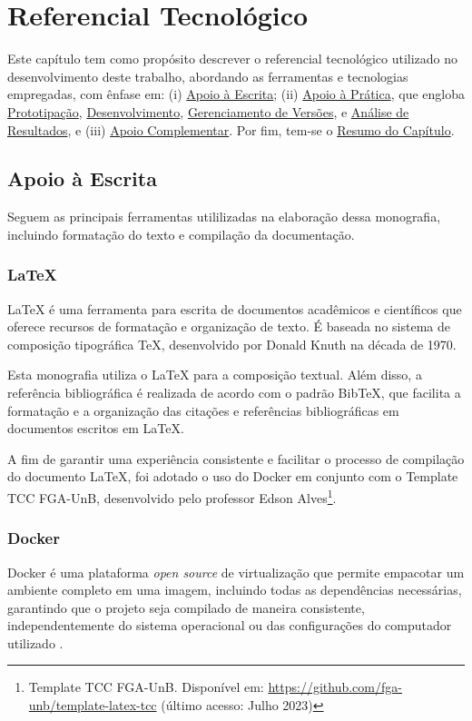\chapter[Referencial Tecnológico]{Referencial Tecnológico}
\label{chap:ReferencialTech}

Este capítulo tem como propósito descrever o referencial tecnológico utilizado no desenvolvimento
deste trabalho, abordando as ferramentas e tecnologias empregadas, com ênfase em: (i) \hyperref[sec:Apoio a Escrita]{Apoio à Escrita}; 
(ii) \hyperref[sec:Apoio à Prática]{Apoio à Prática}, que engloba \hyperref[sec:Prototipação]{Prototipação}, \hyperref[sec:Desenvolvimento]{Desenvolvimento}, \hyperref[sec:Gerenciamento de Versões]{Gerenciamento de Versões}, 
e \hyperref[sec:Análise de Resultados]{Análise de Resultados}, e (iii) \hyperref[sec:Apoio Complementar]{Apoio Complementar}. Por fim, tem-se o \hyperref[sec:Resumo do Capítulo]{Resumo do Capítulo}.

\section{Apoio à Escrita}
\label{sec:Apoio a Escrita}
Seguem as principais ferramentas utililizadas na elaboração dessa monografia, incluindo formatação do texto e compilação da documentação.

\subsection{LaTeX}
\label{sec:Latex}
LaTeX \cite{latex} é uma ferramenta para escrita de documentos acadêmicos e científicos que oferece 
recursos de formatação e organização de texto. É baseada no sistema de composição tipográfica 
TeX, desenvolvido por Donald Knuth na década de 1970.

Esta monografia utiliza o LaTeX para a composição textual. Além disso, a referência bibliográfica 
é realizada de acordo com o padrão BibTeX, que facilita a formatação e a organização das citações e 
referências bibliográficas em documentos escritos em LaTeX.

A fim de garantir uma experiência consistente e facilitar o processo de compilação do documento LaTeX, foi 
adotado o uso do Docker em conjunto com o Template TCC FGA-UnB, desenvolvido pelo professor 
Edson Alves\footnote{Template TCC FGA-UnB. Disponível
em: \url{https://github.com/fga-unb/template-latex-tcc} (último acesso: Julho 2023)}.

\subsection{Docker}
\label{sec:Docker}
Docker é uma plataforma \textit{open source} de virtualização que permite empacotar um ambiente completo em 
uma imagem, incluindo todas as dependências necessárias, garantindo que o projeto seja 
compilado de maneira consistente, independentemente do sistema operacional ou das configurações do computador   
utilizado \cite{docker}.

